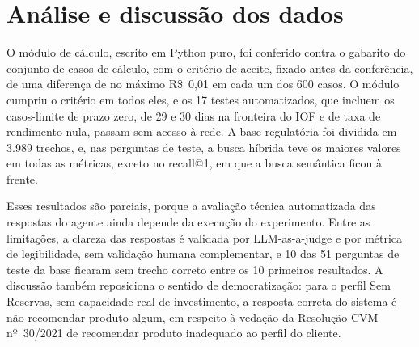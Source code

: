 
\section{Análise e discussão dos dados}

O módulo de cálculo, escrito em Python puro, foi conferido contra o gabarito
do conjunto de casos de cálculo, com o critério de aceite, fixado antes da
conferência, de uma diferença de no máximo R\$~0,01 em cada um dos 600 casos.
O módulo cumpriu o critério em todos eles, e os 17 testes automatizados,
que incluem os casos-limite de prazo zero, de 29 e 30 dias na fronteira do
IOF e de taxa de rendimento nula, passam sem acesso à rede. A base regulatória
foi dividida em 3.989 trechos, e, nas perguntas de teste, a busca híbrida teve
os maiores valores em todas as métricas, exceto no recall@1, em que a busca
semântica ficou à frente.

Esses resultados são parciais, porque a avaliação técnica automatizada das
respostas do agente ainda depende da execução do experimento. Entre as
limitações, a clareza das respostas é validada por LLM-as-a-judge e por
métrica de legibilidade, sem validação humana complementar, e 10 das 51
perguntas de teste da base ficaram sem trecho correto entre os 10 primeiros
resultados. A discussão também reposiciona o sentido de democratização: para o
perfil Sem Reservas, sem capacidade real de investimento, a resposta correta
do sistema é não recomendar produto algum, em respeito à vedação da Resolução
CVM nº~30/2021 de recomendar produto inadequado ao perfil do cliente.
